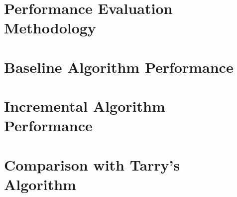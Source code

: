 \section{Performance Evaluation Methodology}
\label{section_result_performance_evaluation}

\section{Baseline Algorithm Performance}
\label{section_result_baseline}

\section{Incremental Algorithm Performance}
\label{section_result_incremental}

\section{Comparison with Tarry's Algorithm}
\label{section_result_tarry}